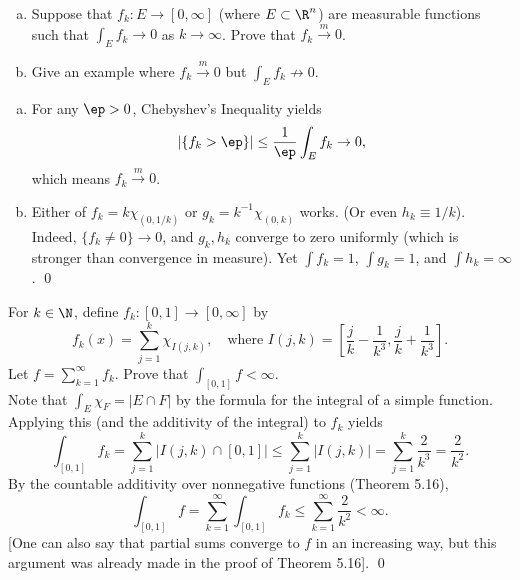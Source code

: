 \begin{hwsol} \hfill
\begin{enumerate}[(a)]
\item Suppose that $f_k: E \to [0, \infty]$ (where $E \subset \R^n$) are measurable functions such that $\int_E f_k \to 0$ as $k \to \infty$. Prove that $f_k \xrightarrow{m} 0$.  
\item Give an example where $f_k \xrightarrow{m} 0$ but  $\int_E f_k \not\to 0$. \\
\end{enumerate}

\pf \hfill
\begin{enumerate}[(a)]
\item For any $\ep > 0$, Chebyshev's Inequality yields
        \[
        |\{ f_k > \ep \}| \leq \frac{1}{\ep} \int_E f_k \to 0,
        \]
which means $f_k\xrightarrow{m}0$.

\item Either of $f_k= k \chi_{(0,1/k)}$ or $g_k= k^{-1} \chi_{(0, k)}$ works. (Or even $h_k \equiv 1/k$). Indeed, $\{ f_k \neq 0 \} \to 0$, and $g_k, h_k$ converge to zero uniformly (which is stronger than convergence in measure). Yet $\int f_k= 1$, $\int g_k= 1$, and $\int h_k= \infty$. \qed \\
\end{enumerate}
\end{hwsol}


\begin{hwsol}
For $k \in \N$, define $f_k: [0, 1]\to [0, \infty]$ by 
        \[
        f_k(x)= \sum_{j=1}^k \chi_{I(j, k)}, \quad \text{where } I(j, k)= \left[ \frac{j}{k} - \frac{1}{k^3}, \frac{j}{k}+\frac{1}{k^3} \right].
        \]
Let $f= \sum_{k=1}^\infty f_k$. Prove that $\int_{[0, 1]} f <\infty$. \\

\pf Note that $\int_E \chi_F= |E \cap F|$ by the formula for the integral of a simple function. Applying this (and the additivity of the integral) to $f_k$ yields
        \[
        \int_{[0, 1]} f_k= \sum_{j=1}^k |I(j, k) \cap [0, 1]| \leq \sum_{j=1}^k |I(j, k)|= \sum_{j=1}^k \frac{2}{k^3}= \frac{2}{k^2}.
        \]
By the countable additivity over nonnegative functions (Theorem 5.16), 
        \[ 
        \int_{[0, 1]} f=  \sum_{k=1}^\infty \int_{[0, 1]} f_k \leq \sum_{k=1}^\infty \frac{2}{k^2} < \infty.
        \]
[One can also say that partial sums converge to $f$ in an increasing way, but this argument was already made in the proof of Theorem 5.16]. \qed \\
\end{hwsol}


